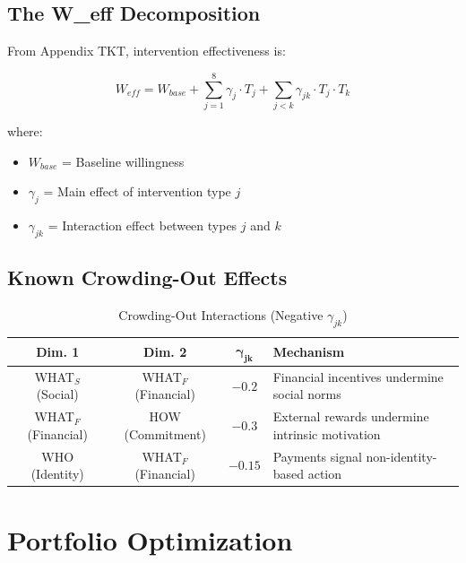 \subsection{The W\_eff Decomposition}

From Appendix TKT, intervention effectiveness is:

\begin{equation}
\boxed{
W_{eff} = W_{base} + \sum_{j=1}^{8} \gamma_j \cdot T_j + \sum_{j<k} \gamma_{jk} \cdot T_j \cdot T_k
}
\label{eq:weff}
\end{equation}

where:
\begin{itemize}
\item $W_{base}$ = Baseline willingness
\item $\gamma_j$ = Main effect of intervention type $j$
\item $\gamma_{jk}$ = Interaction effect between types $j$ and $k$
\end{itemize}

\subsection{Known Crowding-Out Effects}

\begin{table}[htbp]
\centering
\caption{Crowding-Out Interactions (Negative $\gamma_{jk}$)}
\label{tab:crowding-out}
\renewcommand{\arraystretch}{1.3}
\begin{tabular}{@{}cccp{6cm}@{}}
\toprule
\textbf{Dim. 1} & \textbf{Dim. 2} & $\boldsymbol{\gamma_{jk}}$ & \textbf{Mechanism} \\
\midrule
WHAT$_S$ (Social) & WHAT$_F$ (Financial) & $-0.2$ & Financial incentives undermine social norms \\
WHAT$_F$ (Financial) & HOW (Commitment) & $-0.3$ & External rewards undermine intrinsic motivation \\
WHO (Identity) & WHAT$_F$ (Financial) & $-0.15$ & Payments signal non-identity-based action \\
\bottomrule
\end{tabular}
\end{table}


\section{Portfolio Optimization}
\label{sec:calc-portfolio}

